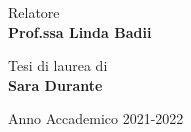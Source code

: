 \begin{titlepage}
\begin{minipage}[t]{0.47\textwidth}
	{\large{Relatore}{\normalsize\vspace{3mm}
    \bf\\ \large{Prof.ssa Linda Badii} \normalsize\vspace{3mm}\bf}}
\end{minipage}
\hfill
\begin{minipage}[t]{0.47\textwidth}\raggedleft
	{\large{Tesi di laurea di}{\normalsize\vspace{3mm} \bf\\ \large{Sara Durante}}}
\end{minipage}

\vspace{10mm}

\begin{center}
    {\large{Anno Accademico 2021-2022}}
\end{center}

\vspace{30mm}

\end{titlepage}

